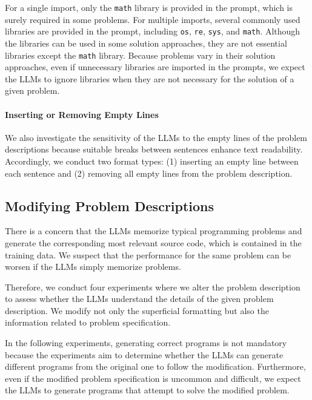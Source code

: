 \documentclass{article}
\begin{document}
For a single import, only the \texttt{math} library is provided in the prompt, which is surely required in some problems.
For multiple imports, several commonly used libraries are provided in the prompt, including \texttt{os}, \texttt{re}, \texttt{sys}, and \texttt{math}.
Although the libraries can be used in some solution approaches, they are not essential libraries except the \texttt{math} library.
Because problems vary in their solution approaches, even if unnecessary libraries are imported in the prompts, we expect the LLMs to ignore libraries when they are not necessary for the solution of a given problem.



\paragraph{Inserting or Removing Empty Lines}

We also investigate the sensitivity of the LLMs to the empty lines of the problem descriptions because suitable breaks between sentences enhance text readability.
Accordingly, we conduct two format types: (1) inserting an empty line between each sentence and (2) removing all empty lines from the problem description.








\subsection{Modifying Problem Descriptions}
\label{sec:experiments:modification}

There is a concern that the LLMs memorize typical programming problems and generate the corresponding most relevant source code, which is contained in the training data.
We suspect that the performance for the same problem can be worsen if the LLMs simply memorize problems.

Therefore, we conduct four experiments where we alter the problem description to assess whether the LLMs understand the details of the given problem description.
We modify not only the superficial formatting but also the information related to problem specification.

In the following experiments, generating correct programs is not mandatory because the experiments aim to determine whether the LLMs can generate different programs from the original one to follow the modification.
Furthermore, even if the modified problem specification is uncommon and difficult, we expect the LLMs to generate programs that attempt to solve the modified problem.
\end{document}
